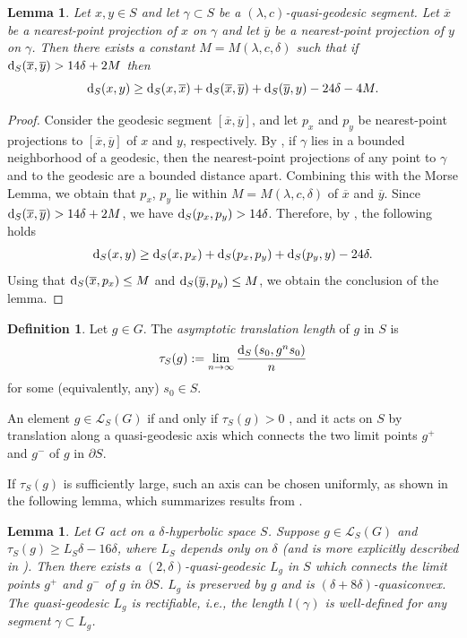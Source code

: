 \documentclass[11pt,letterpaper]{article}
\renewcommand{\d}{{\rm d}}
\renewcommand{\d}{{\rm d}}
\newtheorem{lem}[thm]{Lemma}
\theoremstyle{definition}
\newtheorem{defn}[thm]{Definition}
\theoremstyle{remark}
\begin{document}
\begin{lem}\label{projection distanse formula}
Let $x, y \in S$ and let $\gamma \subset S$ be a $(\lambda, c)$-quasi-geodesic segment. Let $\overline{x}$ be a nearest-point projection of $x$ on $\gamma$ and let $\overline{y}$ be a nearest-point projection of $y$ on $\gamma$. Then there exists a constant $M=M(\lambda, c, \delta)$ such that if $\d_S(\overline{x}, \overline{y})>14\delta+2M$ then 
$$
\d_S(x, y) \geq \d_S(x, \overline{x})+\d_S(\overline{x}, \overline{y})+\d_S(\overline{y}, y)-24 \delta-4M.
$$
\end{lem}
\begin{proof}
Consider the geodesic segment $[\overline{x}, \overline{y}]$, and let $p_x$ and $p_y$ be nearest-point projections to $[\overline{x}, \overline{y}]$ of $x$ and $y$, respectively.   
By \cite[Proposition 3.6]{Mah}, if $\gamma$ lies in a bounded neighborhood of a geodesic, then the nearest-point projections of any point to $\gamma$ and to the geodesic are a bounded distance apart. Combining this with the Morse Lemma, we obtain that $p_x$, $p_y$ lie within  $M=M(\lambda, c, \delta)$ of $\overline{x}$ and $\overline{y}$. Since $\d_S(\overline{x}, \overline{y})>14\delta+2M$, we have $\d_S(p_x, p_y)>14\delta$. Therefore, by \cite[Proposition 3.4]{Mah}, the following holds
$$
\d_S(x, y) \geq \d_S(x, p_x)+\d_S(p_x, p_y)+\d_S(p_y, y)-24 \delta.
$$
Using that $\d_S(\overline{x}, p_x)\leq M$ and $\d_S(\overline{y}, p_y)\leq M$, we obtain the conclusion of the lemma.
\end{proof}

\begin{defn}
Let $g \in G$. The {\it asymptotic translation length} of $g$ in $S$ is
$$
\tau_S(g):=\lim _{n \rightarrow \infty} \frac{\d_S\left(s_0, g^n s_0\right)}{n}
$$
for some (equivalently, any) $s_0 \in S$.
\end{defn}

An element $g \in \mathcal{L}_S(G)$ if and only if $\tau_S(g)>0$ \cite[ Chapitre 10, Proposition 6.3]{french book}, and it acts on $S$ by translation along a quasi-geodesic axis which connects the two limit points $g^+$ and $g^-$ of $g$ in $\partial S$.

If $\tau_S(g)$ is sufficiently large, such an axis can be chosen uniformly, as shown in the following lemma, which summarizes results from \cite[Section 3]{Cou16}.

\begin{lem}\label{uniform axis}
Let $G$ act on a $\delta$-hyperbolic space $S$. Suppose $g \in \mathcal{L}_S(G)$ and $\tau_S(g) \geq L_S \delta-16 \delta$, where $L_S$ depends only on $\delta$ (and is more explicitly described in \cite[Definition 2.8]{Cou16}). Then there exists a $(2, \delta)$-quasi-geodesic $L_g$ in $S$ which connects the limit points $g^+$ and $g^-$ of $g$ in $\partial S$. $L_g$ is preserved by $g$ and is $(\delta+8 \delta)$-quasiconvex. The quasi-geodesic $L_g$ is rectifiable, i.e., the length $l(\gamma)$ is well-defined for any segment $\gamma \subset L_g$.
\end{lem}
\end{document}
